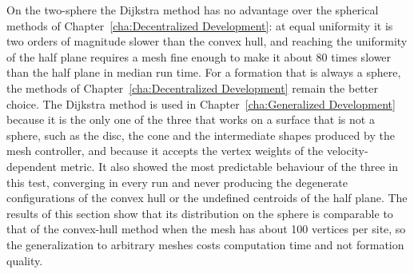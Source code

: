 On the two-sphere the Dijkstra method has no advantage over the spherical methods of Chapter~\ref{cha:Decentralized Development}: at equal uniformity it is two orders of magnitude slower than the convex hull, and reaching the uniformity of the half plane requires a mesh fine enough to make it about 80 times slower than the half plane in median run time. For a formation that is always a sphere, the methods of Chapter~\ref{cha:Decentralized Development} remain the better choice. The Dijkstra method is used in Chapter~\ref{cha:Generalized Development} because it is the only one of the three that works on a surface that is not a sphere, such as the disc, the cone and the intermediate shapes produced by the mesh controller, and because it accepts the vertex weights of the velocity-dependent metric. It also showed the most predictable behaviour of the three in this test, converging in every run and never producing the degenerate configurations of the convex hull or the undefined centroids of the half plane. The results of this section show that its distribution on the sphere is comparable to that of the convex-hull method when the mesh has about 100 vertices per site, so the generalization to arbitrary meshes costs computation time and not formation quality.
